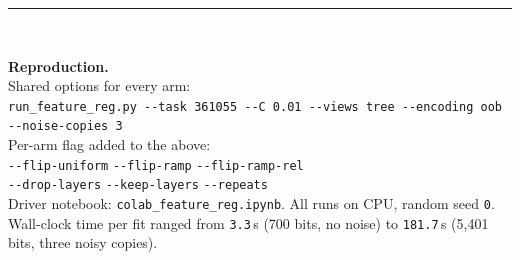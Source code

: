 \documentclass[11pt,a4paper]{article}
\newcommand{\num}[1]{\texttt{#1}}
\begin{document}
\vfill
\noindent\rule{\textwidth}{0.4pt}\\
\begin{flushleft}\footnotesize
\textbf{Reproduction.}\\
Shared options for every arm:\\
\texttt{run\_feature\_reg.py -{}-task 361055 -{}-C 0.01 -{}-views tree -{}-encoding oob -{}-noise-copies 3}\\[2pt]
Per-arm flag added to the above:\\
\texttt{-{}-flip-uniform} \quad \texttt{-{}-flip-ramp} \quad \texttt{-{}-flip-ramp-rel}\\
\texttt{-{}-drop-layers} \quad \texttt{-{}-keep-layers} \quad \texttt{-{}-repeats}\\[2pt]
Driver notebook: \texttt{colab\_feature\_reg.ipynb}. All runs on CPU, random
seed \num{0}. Wall-clock time per fit ranged from \num{3.3}\,s (700 bits, no
noise) to \num{181.7}\,s (5{,}401 bits, three noisy copies).
\end{flushleft}
\end{document}
